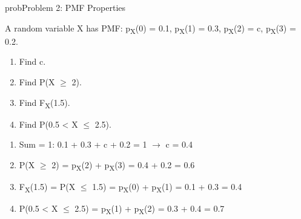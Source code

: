 \begin{PSbox}[unbreakable]{prob}{Problem 2: PMF Properties}

A random variable X has PMF: p\textsubscript{X}(0) = 0.1, p\textsubscript{X}(1) = 0.3, p\textsubscript{X}(2) = c, p\textsubscript{X}(3) = 0.2.

\begin{enumerate}
\def\labelenumi{(\alph{enumi})}
\tightlist
\item
  Find c.
\item
  Find P(X \ensuremath{\ge} 2).
\item
  Find F\textsubscript{X}(1.5).
\item
  Find P(0.5 \textless{} X \ensuremath{\le} 2.5).
\end{enumerate}

\PSsolution{} 

\begin{enumerate}
\def\labelenumi{(\alph{enumi})}
\item
  Sum = 1: 0.1 + 0.3 + c + 0.2 = 1 \ensuremath{\to} c = 0.4
\item
  P(X \ensuremath{\ge} 2) = p\textsubscript{X}(2) + p\textsubscript{X}(3) = 0.4 + 0.2 = 0.6
\item
  F\textsubscript{X}(1.5) = P(X \ensuremath{\le} 1.5) = p\textsubscript{X}(0) + p\textsubscript{X}(1) = 0.1 + 0.3 = 0.4
\item
  P(0.5 \textless{} X \ensuremath{\le} 2.5) = p\textsubscript{X}(1) + p\textsubscript{X}(2) = 0.3 + 0.4 = 0.7
\end{enumerate}

\end{PSbox}


